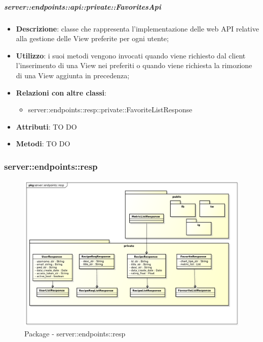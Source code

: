     \subparagraph{server::endpoints::api::private::FavoritesApi} %
    \label{subp:bdsm_app_server_endpoints_api_private_favoritesapi}
    \begin{itemize}
      \item \textbf{Descrizione}: classe che rappresenta l'implementazione delle web API relative alla gestione delle View preferite per ogni utente;
      \item \textbf{Utilizzo}: i suoi metodi vengono invocati quando viene richiesto dal client l'inserimento di una View nei preferiti o quando viene richiesta la rimozione di una View aggiunta in precedenza;
      \item \textbf{Relazioni con altre classi}:
        \begin{itemize}
          \item server::endpoints::resp::private::FavoriteListResponse
        \end{itemize}
		\item \textbf{Attributi}: TO DO
		\item \textbf{Metodi}: TO DO
      \end{itemize}

\subsubsection{server::endpoints::resp} %
\label{ssub:bdsm_app_server_endpoints_resp}
\begin{figure}[!htbp]
	\centering
	\centerline{\includegraphics[scale=0.45]{./images/server/resp.pdf}}
	\caption{Package - server::endpoints::resp}
\end{figure}

